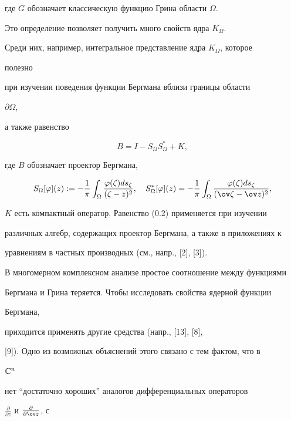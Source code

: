 где $G$ обозначает классическую функцию Грина области $\Omega$. 


 


Это определение позволяет получить много свойств ядра $K_\Omega$. 


Среди них, например, интегральное представление ядра $K_\Omega$, которое 


полезно 


при изучении поведения функции Бергмана вблизи границы области 


$\partial\Omega$, 


а также равенство 


\begin{equation} 


B=I-S_\Omega S^*_\Omega+K, \tag{0.2} 


\end{equation} 


где $B$ обозначает проектор Бергмана, 


$$ 


S_\Omega[\varphi](z):=-\frac{1}{\pi}\int_\Omega 


\frac{\varphi(\zeta)ds_\zeta}{(\zeta-z)^2},\quad 


S^*_\Omega[\varphi](z)=-\frac{1}{\pi}\int_\Omega 


\frac{\varphi(\zeta)ds_\zeta}{(\ov\zeta-\ov z)^2},


$$ 


$K$ есть компактный оператор. Равенство (0.2) применяется при изучении 


различных алгебр, содержащих проектор Бергмана, а также в приложениях к 


уравнениям в частных производных (см., напр., [2], [3]). 


 


В многомерном комплексном анализе простое соотношение между функциями 


Бергмана и Грина теряется. Чтобы исследовать свойства ядерной функции 


Бергмана, 


приходится применять другие средства (напр., [13], [8],


[9]). Одно из возможных объяснений этого связано с тем фактом, что в 


$\Bbb C^n$ 


нет ``достаточно хороших'' аналогов дифференциальных операторов 


$\frac{\partial}{\partial z}$ и $\frac{\partial}{\partial\ov z}$, с 


